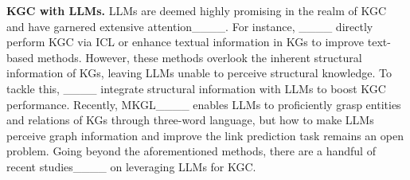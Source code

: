 \textbf{KGC with LLMs.} 
LLMs are deemed highly promising in the realm of KGC and have garnered extensive attention____.
For instance, ____ directly perform KGC via ICL or enhance textual information in KGs to improve text-based methods. However, these methods overlook the inherent structural information of KGs, leaving LLMs unable to perceive structural knowledge. To tackle this, ____ integrate structural information with LLMs to boost KGC performance. Recently, MKGL____ enables LLMs to proficiently grasp entities and relations of KGs through three-word language, but how to make LLMs perceive graph information and improve the link prediction task remains an open problem.
Going beyond the aforementioned methods, there are a handful of recent studies____ on leveraging LLMs for KGC.





